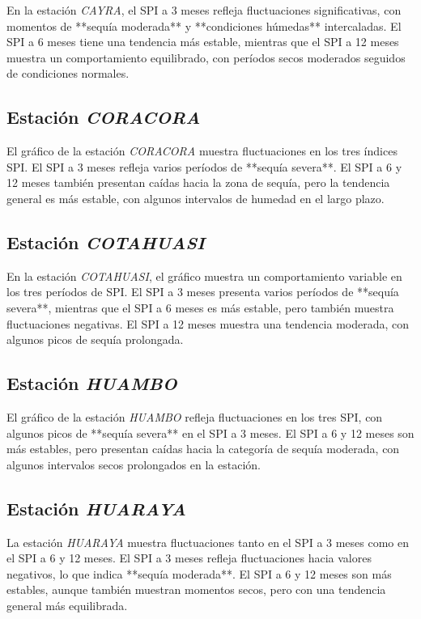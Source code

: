 En la estación \textit{CAYRA}, el SPI a 3 meses refleja fluctuaciones significativas, con momentos de **sequía moderada** y **condiciones húmedas** intercaladas. El SPI a 6 meses tiene una tendencia más estable, mientras que el SPI a 12 meses muestra un comportamiento equilibrado, con períodos secos moderados seguidos de condiciones normales.

\subsection*{Estación \textit{CORACORA}}

El gráfico de la estación \textit{CORACORA} muestra fluctuaciones en los tres índices SPI. El SPI a 3 meses refleja varios períodos de **sequía severa**. El SPI a 6 y 12 meses también presentan caídas hacia la zona de sequía, pero la tendencia general es más estable, con algunos intervalos de humedad en el largo plazo.

\subsection*{Estación \textit{COTAHUASI}}

En la estación \textit{COTAHUASI}, el gráfico muestra un comportamiento variable en los tres períodos de SPI. El SPI a 3 meses presenta varios períodos de **sequía severa**, mientras que el SPI a 6 meses es más estable, pero también muestra fluctuaciones negativas. El SPI a 12 meses muestra una tendencia moderada, con algunos picos de sequía prolongada.

\subsection*{Estación \textit{HUAMBO}}

El gráfico de la estación \textit{HUAMBO} refleja fluctuaciones en los tres SPI, con algunos picos de **sequía severa** en el SPI a 3 meses. El SPI a 6 y 12 meses son más estables, pero presentan caídas hacia la categoría de sequía moderada, con algunos intervalos secos prolongados en la estación.

\subsection*{Estación \textit{HUARAYA}}

La estación \textit{HUARAYA} muestra fluctuaciones tanto en el SPI a 3 meses como en el SPI a 6 y 12 meses. El SPI a 3 meses refleja fluctuaciones hacia valores negativos, lo que indica **sequía moderada**. El SPI a 6 y 12 meses son más estables, aunque también muestran momentos secos, pero con una tendencia general más equilibrada.


